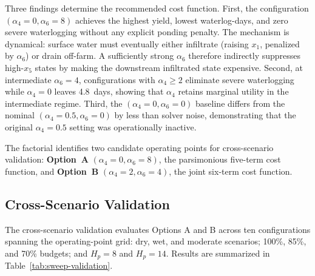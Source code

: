 Three findings determine the recommended cost function. First, the
configuration $(\alpha_4 = 0, \alpha_6 = 8)$ achieves the highest yield,
lowest waterlog-days, and zero severe waterlogging without any explicit
ponding penalty. The mechanism is dynamical: surface water must eventually
either infiltrate (raising $x_1$, penalized by $\alpha_6$) or drain
off-farm. A sufficiently strong $\alpha_6$ therefore indirectly suppresses
high-$x_5$ states by making the downstream infiltrated state expensive.
Second, at intermediate $\alpha_6 = 4$, configurations with $\alpha_4 \geq 2$
eliminate severe waterlogging while $\alpha_4 = 0$ leaves 4.8~days, showing
that $\alpha_4$ retains marginal utility in the intermediate regime.
Third, the $(\alpha_4 = 0, \alpha_6 = 0)$ baseline differs from the nominal
$(\alpha_4 = 0.5, \alpha_6 = 0)$ by less than solver noise, demonstrating
that the original $\alpha_4 = 0.5$ setting was operationally inactive.

The factorial identifies two candidate operating points for cross-scenario
validation: \textbf{Option~A} $(\alpha_4 = 0, \alpha_6 = 8)$, the
parsimonious five-term cost function, and \textbf{Option~B}
$(\alpha_4 = 2, \alpha_6 = 4)$, the joint six-term cost function.

\subsection{Cross-Scenario Validation}
\label{ssec:ctrl-sweep-validation}

The cross-scenario validation evaluates Options A and B across ten
configurations spanning the operating-point grid: dry, wet, and moderate
scenarios; 100\%, 85\%, and 70\% budgets; and $H_p = 8$ and $H_p = 14$.
Results are summarized in Table~\ref{tab:sweep-validation}.

